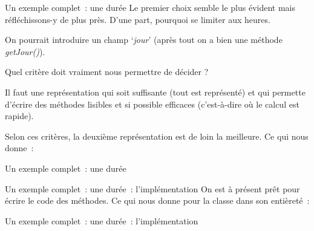 \begin{frame}{Un exemple complet~: une durée}
	Le premier choix semble le plus évident mais réfléchissons-y de plus
	près. D’une part, pourquoi se limiter aux heures. 
	
	On pourrait
	introduire un champ ‘\textit{jour}’ (après tout on a bien
	une méthode \textit{getJour()}). 
	
	\bigskip
	
	Quel critère doit vraiment nous permettre de décider ? 
	
	Il faut une
	représentation qui soit suffisante (tout est représenté) et qui
	permette d’écrire des méthodes lisibles et si possible efficaces
	(c'est-à-dire où le calcul est rapide). 
	
	Selon ces
	critères, la deuxième représentation est de loin la meilleure. Ce qui
	nous donne~:
\end{frame}

\begin{frame}{Un exemple complet~: une durée}
\end{frame}

\begin{frame}{Un exemple complet~: une durée~: l'implémentation}
	On est à présent prêt pour écrire le code des méthodes. Ce qui nous
	donne pour la classe dans son entièreté~:
\end{frame}

\begin{frame}{Un exemple complet~: une durée~: l'implémentation}
\end{frame}

